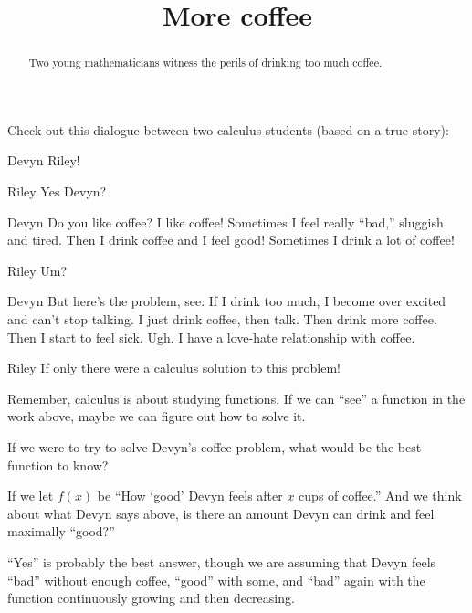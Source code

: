 \documentclass{ximera}
\title[Break-Ground:]{More coffee}
\begin{document}
\begin{abstract}
Two young mathematicians witness the perils of drinking too much
coffee.
\end{abstract}
\maketitle

Check out this dialogue between two calculus students (based on a true
story):

\begin{dialogue}
\item[Devyn] Riley! 
\item[Riley] Yes Devyn?
\item[Devyn] Do you like coffee? I like coffee! Sometimes I feel
  really ``bad,'' sluggish and tired. Then I drink coffee and I feel
  good! Sometimes I drink a lot of coffee!
\item[Riley] Um?
\item[Devyn] But here's the problem, see: If I drink too much, I
  become over excited and can't stop talking. I just drink coffee,
  then talk. Then drink more coffee. Then I start to feel sick. Ugh. I
  have a love-hate relationship with coffee.
\item[Riley] If only there were a calculus solution to this problem!
\end{dialogue}

Remember, calculus is about studying functions. If we can ``see'' a function in the work above, maybe we can figure out how to solve it. 

\begin{problem}
  If we were to try to solve Devyn's coffee problem, what would be the best
  function to know?
  \begin{multipleChoice}
  \end{multipleChoice}
\begin{problem}
  If we let $f(x)$ be ``How `good' Devyn feels after $x$ cups of
  coffee.'' And we think about what Devyn says above, is there an amount Devyn can drink and feel maximally ``good?''
  \begin{multipleChoice}
  \end{multipleChoice}
  \begin{feedback}
    ``Yes'' is probably the best answer, though we are assuming that
    Devyn feels ``bad'' without enough coffee, ``good'' with some, and
    ``bad'' again with the function continuously growing and then
    decreasing.
  \end{feedback}
\end{problem}
\end{problem}




%
\end{document}
